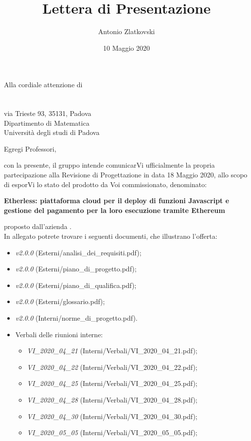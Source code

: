 \documentclass[a4paper]{letter}
\title{Lettera di Presentazione}
\author{Antonio Zlatkovski}
\begin{document}
\begin{letter} {Alla cordiale attenzione di \\ \TV \\ \RC \\ via Trieste 93, 35131, Padova\\ Dipartimento di Matematica \\ Università degli studi di Padova }
  \vspace*{-0.4\baselineskip}
\date{10 Maggio 2020}
\opening{Egregi Professori,}
con la presente, il gruppo \Gruppo{} intende comunicarVi ufficialmente la propria partecipazione alla Revisione di Progettazione in data 18 Maggio 2020, allo scopo di esporVi lo stato del prodotto da Voi commissionato, denominato:
  \begin{center}
    \textbf{Etherless: piattaforma cloud per il deploy di funzioni Javascript e gestione del pagamento per la loro esecuzione tramite Ethereum}
  \end{center}
  proposto dall'azienda \Proponente.\\
  In allegato potrete trovare i seguenti documenti, che illustrano l'offerta:
  \begin{itemize}
    \item \AdR{} \textit{v2.0.0} (Esterni/analisi\_dei\_requisiti.pdf);
    \item \PdP{} \textit{v2.0.0} (Esterni/piano\_di\_progetto.pdf);
    \item \PdQ{} \textit{v2.0.0} (Esterni/piano\_di\_qualifica.pdf);
    \item \Glossario{} \textit{v2.0.0} (Esterni/glossario.pdf);
    \item \NdP{} \textit{v2.0.0} (Interni/norme\_di\_progetto.pdf).
    \item Verbali delle riunioni interne:
      \begin{itemize}
				\item \textit{VI\_2020\_04\_21} (Interni/Verbali/VI\_2020\_04\_21.pdf);
				\item \textit{VI\_2020\_04\_22} (Interni/Verbali/VI\_2020\_04\_22.pdf);
				\item \textit{VI\_2020\_04\_25} (Interni/Verbali/VI\_2020\_04\_25.pdf);
				\item \textit{VI\_2020\_04\_28} (Interni/Verbali/VI\_2020\_04\_28.pdf);
				\item \textit{VI\_2020\_04\_30} (Interni/Verbali/VI\_2020\_04\_30.pdf);
				\item \textit{VI\_2020\_05\_05} (Interni/Verbali/VI\_2020\_05\_05.pdf);

\end{itemize}
\end{itemize}
\end{letter}
\end{document}
